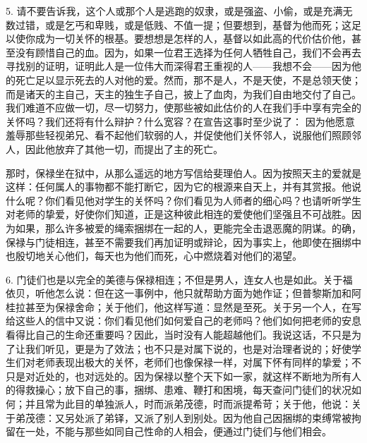 5. 请不要告诉我，这个人或那个人是逃跑的奴隶，或是强盗、小偷，或是充满无数过错，或是乞丐和卑贱，或是低贱、不值一提；但要想到，基督为他而死；这足以使你成为一切关怀的根基。要想想是怎样的人，基督以如此高的代价估价他，甚至没有顾惜自己的血。因为，如果一位君王选择为任何人牺牲自己，我们不会再去寻找别的证明，证明此人是一位伟大而深得君王重视的人——我想不会——因为他的死亡足以显示死去的人对他的爱。然而，那不是人，不是天使，不是总领天使；而是诸天的主自己，天主的独生子自己，披上了血肉，为我们自由地交付了自己。我们难道不应做一切，尽一切努力，使那些被如此估价的人在我们手中享有完全的关怀吗？我们还将有什么辩护？什么宽容？在宣告这事时至少说了： 因为他愿意羞辱那些轻视弟兄、看不起他们软弱的人，并促使他们关怀邻人，说服他们照顾邻人，因此他放弃了其他一切，而提出了主的死亡。\par

那时，保禄坐在狱中，从那么遥远的地方写信给斐理伯人。因为按照天主的爱就是这样：任何属人的事物都不能打断它，因为它的根源来自天上，并有其赏报。他说什么呢？你们看见他对学生的关怀吗？你们看见为人师者的细心吗？也请听听学生对老师的挚爱，好使你们知道，正是这种彼此相连的爱使他们坚强且不可战胜。因为如果，那么许多被爱的绳索捆绑在一起的人，更能完全击退恶魔的阴谋。的确，保禄与门徒相连，甚至不需要我们再加证明或辩论，因为事实上，他即使在捆绑中也殷切地关心他们，每天也为他们而死，心中燃烧着对他们的渴望。\par

6. 门徒们也是以完全的美德与保禄相连；不但是男人，连女人也是如此。关于福依贝，听他怎么说：但在这一事例中，他只就帮助方面为她作证；但普黎斯加和阿桂拉甚至为保禄舍命；关于他们，他这样写道：显然是至死。关于另一个人，在写给这些人的信中又说：你们看见他们如何爱自己的老师吗？他们如何把老师的安息看得比自己的生命还重要吗？因此，当时没有人能超越他们。我说这话，不只是为了让我们听见，更是为了效法；也不只是对属下说的，也是对治理者说的；好使学生们对老师表现出极大的关怀，老师们也像保禄一样，对属下怀有同样的挚爱；不只是对近处的，也对远处的。因为保禄以整个天下如一家，就这样不断地为所有人的得救操心；放下自己的事，捆绑、患难、鞭打和困境，每天查问门徒们的状况如何；并且常为此目的单独派人，时而派弟茂德，时而派提希苛；关于他，他说：关于弟茂德：又另处派了弟铎，又派了别人到别处。因为他自己因捆绑的束缚常被拘留在一处，不能与那些如同自己性命的人相会，便通过门徒们与他们相会。\par

